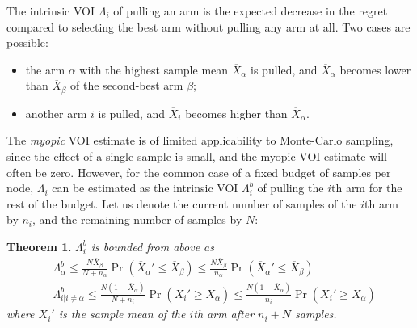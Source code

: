 \documentclass{ecai2012}
\newtheorem{thm}{Theorem}
\begin{document}
The intrinsic VOI $\Lambda_i$ of pulling an arm is the expected decrease
in the regret compared to selecting the best arm without pulling any arm at
all. Two cases are possible:
\begin{itemize}
\item the arm $\alpha$ with the highest sample mean $\overline
  X_\alpha$ is pulled, and $\overline X_\alpha$ becomes lower than
  $\overline X_\beta$ of the second-best arm $\beta$;
\item another arm $i$ is pulled, and $\overline X_i$ becomes higher
than $\overline X_\alpha$.
\end{itemize}
The \textit{myopic} VOI estimate is of limited applicability to
Monte-Carlo sampling, since the effect of a single sample is small,
and the myopic VOI estimate will often be zero. However, for the
common case of a fixed budget of samples per node, $\Lambda_i$ can be
estimated as the intrinsic VOI $\Lambda_i^b$ of pulling the $i$th arm
for the rest of the budget.  Let us denote the current number of
samples of the $i$th arm by $n_i$, and the remaining number of samples
by $N$:
\begin{thm} $\Lambda_i^b$ is bounded from above as
\begin{eqnarray}
\label{eqn:thm-be}
 &\Lambda_\alpha^b \le \frac {N \overline X_\beta} {N+n_\alpha}\Pr(\overline X_\alpha'\le\overline X_\beta)
    \le \frac {N \overline X_\beta} {n_\alpha} \Pr(\overline X_\alpha'\le\overline X_\beta)\\
&\Lambda_{i|i\ne\alpha}^b \le \frac{ N(1-\overline  X_\alpha)} {N+n_i}\Pr(\overline X_i'\ge\overline X_\alpha)
     \le \frac {N(1-\overline X_\alpha)} {n_i}\Pr(\overline   X_i'\ge\overline X_\alpha)\nonumber
\end{eqnarray}
where $\overline X_i'$ is the sample mean of the $i$th arm after $n_i+N$ samples.
\label{thm:be}
\end{thm}
\end{document}
